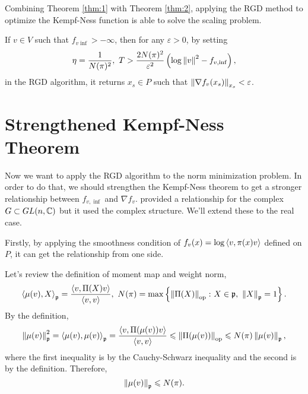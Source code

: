 \documentclass[suri,pdfbookmark]{engsuribt} %
\begin{document}
  Combining Theorem \ref{thm:1} with Theorem \ref{thm:2}, applying the RGD method to optimize the Kempf-Ness function is able to solve the scaling problem.

  \begin{thm}
    If $v \in V$ such that $f_{v \inf} > -\infty$, then for any $\varepsilon>0$, by setting
    \begin{equation*}
      \eta = \frac{1}{N(\pi)^2},~T > \frac{2N(\pi)^2}{\varepsilon^2}\left(\log \left\lVert v\right\lVert^2-f_{v,\inf}\right),
    \end{equation*}
    in the RGD algorithm, it returns $x_s \in P$ such that $\left\lVert\nabla f_v(x_s)\right\lVert_{x_s} < \varepsilon$.
  \end{thm}

  \section{Strengthened Kempf-Ness Theorem}

  Now we want to apply the RGD algorithm to the norm minimization problem. In order to do that, we should strengthen the Kempf-Ness theorem to get a stronger relationship between $f_{v, \inf}$ and $\nabla f_v$. \cite{key8} provided a relationship for the complex $G \subset GL(n,\mathbb{C})$ but it used the complex structure. We'll extend these to the real case.

  Firstly, by applying the smoothness condition of $f_v(x) = \log \left\langle v,\pi(x)v \right\rangle$ defined on $P$, it can get the relationship from one side. 

  Let's review the definition of moment map and weight norm,
  \begin{equation*}
    \left\langle \mu(v),X \right\rangle_{\mathfrak{p}} = \frac{\left\langle v,\Pi(X)v \right\rangle}{\left\langle v,v \right\rangle},~ N(\pi) = \max\left\{\left\lVert\Pi(X)\right\lVert_{\operatorname{op}} \colon X \in \mathfrak{p},~\left\lVert X\right\lVert_{\mathfrak{p}}=1\right\}.
  \end{equation*}
  By the definition, 
  \begin{equation*}
    \left\lVert\mu(v)\right\lVert_{\mathfrak{p}}^2 = \left\langle \mu(v),\mu(v) \right\rangle_{\mathfrak{p}} = \frac{\left\langle v,\Pi(\mu(v))v \right\rangle}{\left\langle v,v \right\rangle} \leqslant \left\lVert\Pi(\mu(v))\right\lVert_{\operatorname{op}} \leqslant N(\pi)\left\lVert\mu(v)\right\lVert_{\mathfrak{p}},
  \end{equation*}
  where the first inequality is by the Cauchy-Schwarz inequality and the second is by the definition. Therefore,
  \begin{equation*}
    \left\lVert\mu(v)\right\lVert_{\mathfrak{p}} \leqslant N(\pi).
  \end{equation*}
\end{document}

